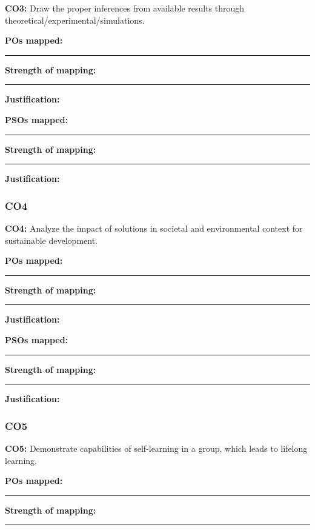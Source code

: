 \textbf{CO3:} Draw the proper inferences from available results through
theoretical/experimental/simulations.

\vspace{0.3cm}

\textbf{POs mapped:} \rule{10cm}{0.4pt}

\textbf{Strength of mapping:} \rule{8.8cm}{0.4pt}

\textbf{Justification:}

\vspace{2cm}

\textbf{PSOs mapped:} \rule{10cm}{0.4pt}

\textbf{Strength of mapping:} \rule{8.8cm}{0.4pt}

\textbf{Justification:}

\vspace{2cm}

\subsubsection*{CO4}

\textbf{CO4:} Analyze the impact of solutions in societal and environmental
context for sustainable development.

\vspace{0.3cm}

\textbf{POs mapped:} \rule{10cm}{0.4pt}

\textbf{Strength of mapping:} \rule{8.8cm}{0.4pt}

\textbf{Justification:}

\vspace{2cm}

\textbf{PSOs mapped:} \rule{10cm}{0.4pt}

\textbf{Strength of mapping:} \rule{8.8cm}{0.4pt}

\textbf{Justification:}

\vspace{2cm}

\subsubsection*{CO5}

\textbf{CO5:} Demonstrate capabilities of self-learning in a group, which
leads to lifelong learning.

\vspace{0.3cm}

\textbf{POs mapped:} \rule{10cm}{0.4pt}

\textbf{Strength of mapping:} \rule{8.8cm}{0.4pt}

